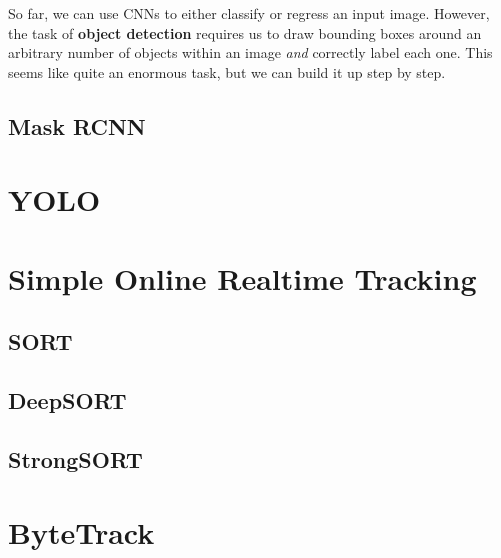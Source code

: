 \documentclass{article}
\theoremstyle{definition}
\theoremstyle{remark}
\theoremstyle{definition}
\begin{document}
So far, we can use CNNs to either classify or regress an input image. However, the task of \textbf{object detection} requires us to draw bounding boxes around an arbitrary number of objects within an image \textit{and} correctly label each one. This seems like quite an enormous task, but we can build it up step by step. 


\subsection{Mask RCNN}

\section{YOLO}

\section{Simple Online Realtime Tracking} 

\subsection{SORT}

\subsection{DeepSORT}

\subsection{StrongSORT}

\section{ByteTrack}
\end{document}
